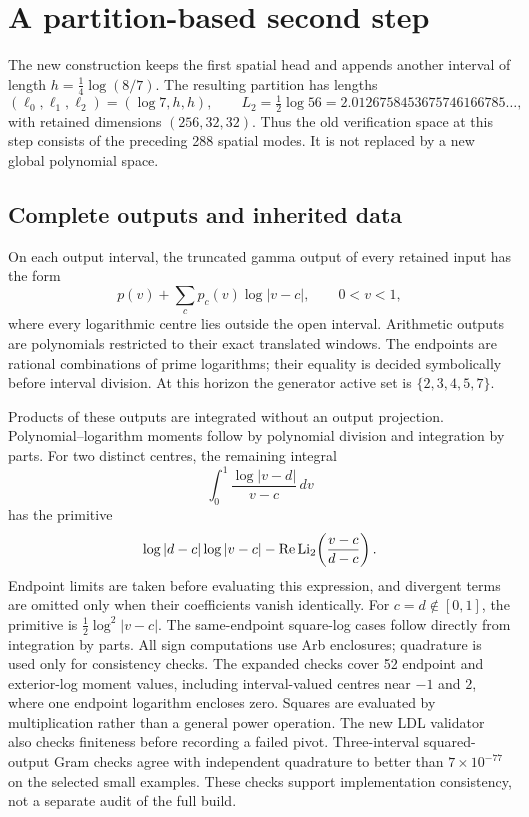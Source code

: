 \section{A partition-based second step}
\label{sec:partition-step}

The new construction keeps the first spatial head and appends another
interval of length \(h=\tfrac14\log(8/7)\). The resulting partition has lengths
\[
 (\ell_0,\ell_1,\ell_2)=(\log7,h,h),\qquad
 L_2=\tfrac12\log56=2.0126758453675746166785\ldots,
\]
with retained dimensions \((256,32,32)\). Thus the old verification space at
this step consists of the preceding 288 spatial modes. It is not replaced
by a new global polynomial space.

\subsection{Complete outputs and inherited data}
On each output interval, the truncated gamma output of every retained input
has the form
\[
 p(v)+\sum_c p_c(v)\log|v-c|,\qquad 0<v<1,
\]
where every logarithmic centre lies outside the open interval. Arithmetic
outputs are polynomials restricted to their exact translated windows.
The endpoints are rational combinations of prime logarithms; their equality
is decided symbolically before interval division. At this horizon the
generator active set is \(\{2,3,4,5,7\}\).

Products of these outputs are integrated without an output projection.
Polynomial--logarithm moments follow by polynomial division and integration
by parts. For two distinct centres, the remaining integral
\[
 \int_0^1\frac{\log|v-d|}{v-c}\,dv
\]
has the primitive
\[
 \log|d-c|\log|v-c|
 -\operatorname{Re}\operatorname{Li}_2\!\left(\frac{v-c}{d-c}\right).
\]
Endpoint limits are taken before evaluating this expression, and divergent
terms are omitted only when their coefficients vanish identically.
For \(c=d\notin[0,1]\), the primitive is
\(\tfrac12\log^2|v-c|\). The same-endpoint square-log cases follow directly
from integration by parts. All sign computations use Arb enclosures;
quadrature is used only for consistency checks. The expanded checks cover
52 endpoint and exterior-log moment values, including interval-valued centres
near $-1$ and $2$, where one endpoint logarithm encloses zero. Squares are
evaluated by multiplication rather than a general power operation. The new
LDL validator also checks finiteness before recording a failed pivot.
Three-interval squared-output Gram checks agree with independent quadrature
to better than $7\times10^{-77}$ on the selected small examples. These checks
support implementation consistency, not a separate audit of the full build.

